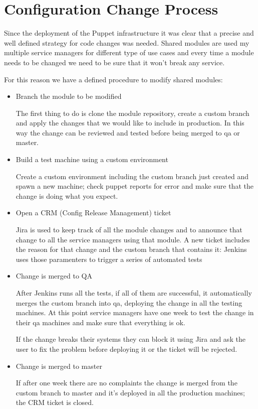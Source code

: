 \section{Configuration Change Process}

Since the deployment of the Puppet infrastructure it was clear that
a precise and well defined strategy for code changes was needed. Shared
modules are used my multiple service managers for different type of use
cases and every time a module needs to be changed we need to be sure that
it won't break any service.

For this reason we have a defined procedure to modify shared modules:

\begin{itemize}

\item Branch the module to be modified

The first thing to do is clone the module repository, create a custom
branch and apply the changes that we would like to include in production.
In this way the change can be reviewed and tested before being merged to
qa or master.

\item Build a test machine using a custom environment

Create a custom environment including the custom branch just created and spawn
a new machine; check puppet reports for error and make sure that the change is
doing what you expect.

\item Open a CRM (Config Release Management) ticket

Jira is used to keep track of all the module changes and to announce that
change to all the service managers using that module. A new ticket includes the
reason for that change and the custom branch that contains it: Jenkins uses
those paramenters to trigger a series of automated tests

\item Change is merged to QA

After Jenkins runs all the tests, if all of them are successful, it
automatically merges the custom branch into qa, deploying the change in all the
testing machines. At this point service managers have one week to test the
change in their qa machines and make sure that everything is ok.

If the change breaks their systems they can block it using Jira and ask the
user to fix the problem before deploying it or the ticket will be rejected.

\item Change is merged to master

If after one week there are no complaints the change is merged from the custom
branch to master and it's deployed in all the production machines; the CRM
ticket is closed.

\end{itemize}

